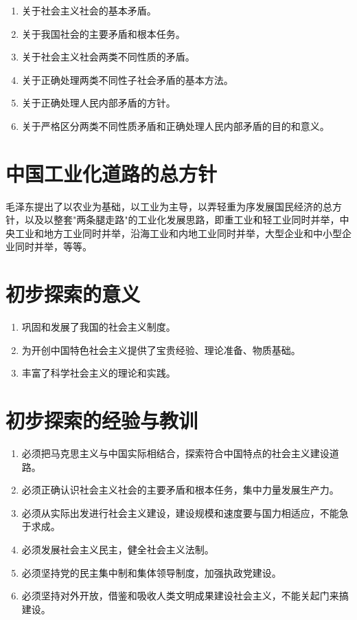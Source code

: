 \documentclass[12pt, a4paper, oneside]{ctexbook}
\begin{document}
\begin{enumerate}[label=（\arabic*）]
\item 关于社会主义社会的基本矛盾。

\item 关于我国社会的主要矛盾和根本任务。

\item 关于社会主义社会两类不同性质的矛盾。

\item 关于正确处理两类不同性子社会矛盾的基本方法。

\item 关于正确处理人民内部矛盾的方针。

\item 关于严格区分两类不同性质矛盾和正确处理人民内部矛盾的目的和意义。
\end{enumerate}

\section{中国工业化道路的总方针}

毛泽东提出了以农业为基础，以工业为主导，以弄轻重为序发展国民经济的总方针，以及以整套"两条腿走路"的工业化发展思路，即重工业和轻工业同时并举，中央工业和地方工业同时并举，沿海工业和内地工业同时并举，大型企业和中小型企业同时并举，等等。

\section{初步探索的意义}

\begin{enumerate}[label=（\arabic*）]
\item 巩固和发展了我国的社会主义制度。

\item 为开创中国特色社会主义提供了宝贵经验、理论准备、物质基础。

\item 丰富了科学社会主义的理论和实践。
\end{enumerate}

\section{初步探索的经验与教训}

\begin{enumerate}[label=（\arabic*）]
\item 必须把马克思主义与中国实际相结合，探索符合中国特点的社会主义建设道路。
\item 必须正确认识社会主义社会的主要矛盾和根本任务，集中力量发展生产力。
\item 必须从实际出发进行社会主义建设，建设规模和速度要与国力相适应，不能急于求成。
\item 必须发展社会主义民主，健全社会主义法制。
\item 必须坚持党的民主集中制和集体领导制度，加强执政党建设。
\item 必须坚持对外开放，借鉴和吸收人类文明成果建设社会主义，不能关起门来搞建设。
\end{enumerate}
\end{document}
